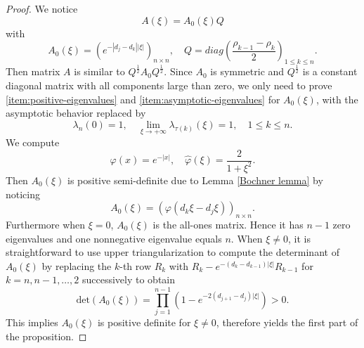 \documentclass[11pt]{article}
\theoremstyle{definition}
\numberwithin{equation}{section}
\begin{document}
\begin{proof}
    We notice
    \begin{equation}
        A(\xi)=A_0(\xi)Q
    \end{equation}
    with
    \begin{equation}\label{def Q and A0}        A_0(\xi)=(e^{-|d_j-d_k||\xi|})_{n\times n},\quad Q=diag(\frac{\rho_{k-1}-\rho_k}{2})_{1\leq k\leq n } .  \end{equation}
    Then matrix $A$ is similar to $Q^{\frac{1}{2}}A_0Q^{\frac{1}{2}}$. Since $A_0$ is symmetric and $Q^{\frac{1}{2}}$ is a constant diagonal matrix with all components large than zero, we only need to prove \ref{item:positive-eigenvalues} and \ref{item:asymptotic-eigenvalues} for $A_0(\xi)$, with the asymptotic behavior replaced by
    \begin{equation}
        \lambda_n(0)=1,\quad\lim_{\xi\rightarrow+\infty}\lambda_{\tau(k)}(\xi)=1,\quad 1\leq k\leq n.
    \end{equation}
    We compute
    \begin{equation}
        \varphi(x)=e^{-|x|},\quad\widehat{\varphi}(\xi)= \frac{2}{1+\xi^2}.
    \end{equation}
    Then $A_0(\xi)$ is positive semi-definite  due to Lemma \ref{Bochner lemma} by noticing
    \begin{equation}
        A_0(\xi)=(\varphi(d_k\xi-d_j\xi))_{n\times n}.
    \end{equation}
    Furthermore when $\xi=0$, $A_0(\xi)$ is the all-ones matrix. Hence it has $n-1$ zero eigenvalues and one nonnegative eigenvalue equals $n$. When $\xi\neq 0$, it is straightforward to use upper triangularization to compute the determinant of $A_0(\xi)$ by replacing the $k$-th row $R_k$ with $R_k-e^{-(d_k-d_{k-1})|\xi|}R_{k-1}$ for $k=n,n-1,\dots,2$ successively to obtain
    \begin{equation}
        \text{det}(A_0(\xi))=\prod_{j=1}^{n-1}\left(1-e^{-2(d_{j+1}-d_j)|\xi|}\right)>0.
    \end{equation}
    This implies $A_0(\xi)$ is positive definite for $\xi\neq0$, therefore yields the first part of the proposition.


\end{proof}
\end{document}

